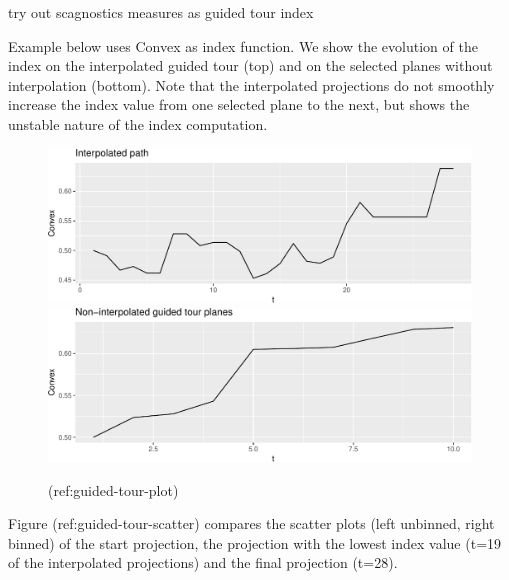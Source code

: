 \documentclass[article]{jss}
\begin{document}
try out scagnostics measures as guided tour index

Example below uses Convex as index function. We show the evolution of
the index on the interpolated guided tour (top) and on the selected
planes without interpolation (bottom). Note that the interpolated
projections do not smoothly increase the index value from one selected
plane to the next, but shows the unstable nature of the index
computation.

\begin{CodeChunk}
\begin{figure}

{\centering \includegraphics[width=\textwidth]{figure/guided-tour-plot-1} \includegraphics[width=\textwidth]{figure/guided-tour-plot-2} 

}

\caption[(ref:guided-tour-plot)]{(ref:guided-tour-plot)}\label{fig:guided-tour-plot}
\end{figure}
\end{CodeChunk}

Figure (ref:guided-tour-scatter) compares the scatter plots (left
unbinned, right binned) of the start projection, the projection with the
lowest index value (t=19 of the interpolated projections) and the final
projection (t=28).
\end{document}
